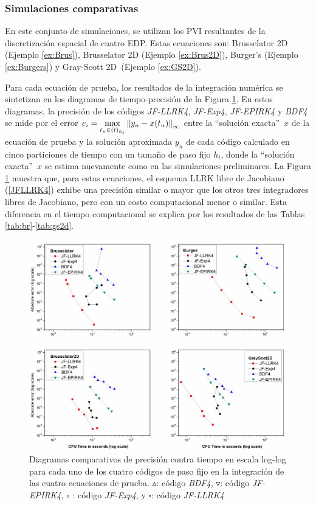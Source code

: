 \subsubsection{Simulaciones comparativas}\label{sc:comparison}

En este conjunto de simulaciones, se utilizan los PVI resultantes de la discretización espacial de cuatro EDP. Estas ecuaciones son: Brusselator 2D (Ejemplo \ref{ex:Brus}), Brusselator 2D (Ejemplo \ref{ex:Brus2D}), Burger's (Ejemplo \ref{ex:Burgers}) y Gray-Scott 2D~(Ejemplo \ref{ex:GS2D}).

Para cada ecuación de prueba, los resultados de la integración numérica se sintetizan en los diagramas de tiempo-precisión de la Figura \ref{work-precision diagram}. En estos diagramas, la precisión de los códigos \textit{JF-LLRK4}, \textit{JF-Exp4}, \textit{JF-EPIRK4} y \textit{BDF4} se mide por el error $e_i=\max\limits_ {t_n\in(t)_{h_i}}\left\lVert y_n-x(t_n) \right\rVert_\infty$ entre la \textquotedblleft solución exacta\textquotedblright~$x$ de la ecuación de prueba y la solución aproximada $y_n$ de cada código calculado en cinco particiones de tiempo con un tamaño de paso fijo $h_i$, donde la \textquotedblleft solución exacta\textquotedblright ~$x $ se estima nuevamente como en las simulaciones preliminares. La Figura \ref{work-precision diagram} muestra que, para estas ecuaciones, el esquema LLRK libre de Jacobiano (\ref{JFLLRK4}) exhibe una precisión similar o mayor que los otros tres integradores libres de Jacobiano, pero con un costo computacional menor o similar. Esta diferencia en el tiempo computacional se explica por los resultados de las Tablas \ref{tab:br}-\ref{tab:gs2d}.

\begin{figure}[htb]
	\centering
	\includegraphics[width=1\textwidth]{Graphics/lldp-fj/Diagram_new.jpg}
	\caption{Diagramas comparativos de precisión contra tiempo en escala log-log para cada uno de los cuatro códigos de paso fijo en la integración de las cuatro ecuaciones de prueba. $\vartriangle$: código \emph{BDF4}, $\triangledown$: código \emph{JF-EPIRK4},  $\circ$ : código \emph{JF-Exp4}, y $\square$: código \emph{JF-LLRK4}} \label{work-precision diagram}
\end{figure}

